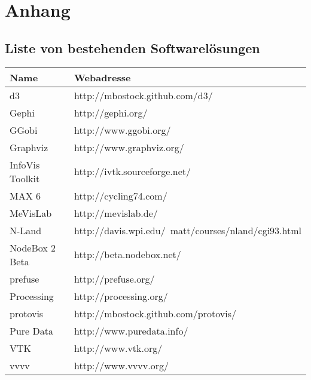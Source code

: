 \documentclass[a4paper, 
               12pt,
               DIV=calc,
               version=first,
               pdftex,
               headsepline,
               footsepline,
               bibliography=totocnumbered,
               listof=numbered]{scrreprt}
\begin{document}
\chapter{Anhang}
\section{Liste von bestehenden Softwarelösungen}
\label{sec:Softwareliste}
\begin{tabular}{l|l}
\hline
Name & Webadresse \\
\hline
d3 & http://mbostock.github.com/d3/\\
Gephi & http://gephi.org/\\
GGobi & http://www.ggobi.org/\\
Graphviz & http://www.graphviz.org/\\
InfoVis Toolkit & http://ivtk.sourceforge.net/\\
MAX 6 & http://cycling74.com/\\
MeVisLab & http://mevislab.de/\\
N-Land & http://davis.wpi.edu/~matt/courses/nland/cgi93.html\\
NodeBox 2 Beta & http://beta.nodebox.net/\\
prefuse & http://prefuse.org/\\
Processing & http://processing.org/\\
protovis & http://mbostock.github.com/protovis/\\
Pure Data & http://www.puredata.info/\\
VTK & http://www.vtk.org/\\
vvvv & http://www.vvvv.org/\\
\hline
\end{tabular}
\end{document}
